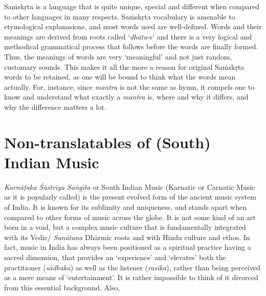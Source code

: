 \newpage

Saṁskṛta is a language that is quite unique, special and different when compared to other languages in many respects. Saṁskṛta vocabulary is amenable to etymological explanasions, and most words used are well-defined. Words and their meanings are derived from roots called ‘\textit{dhātu}-s’ and there is a very logical and methodical grammatical process that follows before the words are finally formed. Thus, the meanings of words are very ‘meaningful’ and not just random, customary sounds. This makes it all the more a reason for original Saṁskṛta words to be retained, as one will be bound to think what the words mean actually. For, instance, since \textit{mantra} is not the same as hymn, it compels one to know and understand what exactly a \textit{mantra} is, where and why it differs, and why the difference matters a lot.

\vspace{-.3cm}

\section*{Non-translatables of (South) Indian Music}

\textit{Karnāṭaka Śāstrīya Saṅgīta} or South Indian Music (Karnatic or Carnatic Music as it is popularly called) is the present evolved form of the ancient music system of India. It is known for its sublimity and uniqueness, and stands apart when compared to other forms of music across the globe. It is not some kind of an art born in a void, but a complex music culture that is fundamentally integrated with its Vedic/ \textit{Sanātana} Dhārmic roots and with Hindu culture and ethos. In fact, music in India has always been positioned as a spiritual practice having a sacred dimension, that provides an ‘experience’ and ‘elevates’ both the practitioner (\textit{sādhaka}) as well as the listener (\textit{rasika}), rather than being perceived as a mere means of ‘entertainment’. It is rather impossible to think of it divorced from this essential background. Also,

